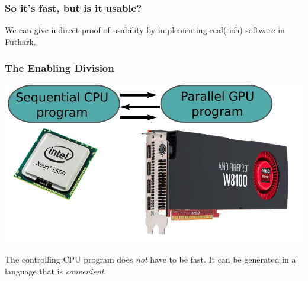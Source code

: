 \documentclass[rgb,dvipsnames]{beamer}
\begin{document}
\begin{frame}
  \frametitle{So it's fast, but is it usable?}

  We can give indirect proof of usability by implementing real(-ish)
  software in Futhark.

\end{frame}

\begin{frame}
  \frametitle{The Enabling Division}

  \includegraphics[width=\textwidth]{img/cpu_gpu_division.pdf}

  \bigskip

  The controlling CPU program does \textit{not} have to be fast.  It
  can be generated in a language that is \textit{convenient}.

\end{frame}
\end{document}
